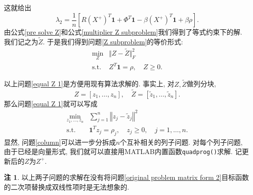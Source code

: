 \documentclass[UTF8,10.5pt,a4paper]{ctexart}
\theoremstyle{definition}
\theoremstyle{definition}
\newtheorem{rem}{注\hspace{0.05pt}}
\newcommand{\st}{\mathrm{s.t.}}
\newcommand{\one}{\mathbf{1}}
\begin{document}
这就给出
\begin{equation}
	\lambda_2=\frac{1}{n}\left[R\left(X^+\right)^T\one+\Phi^T\one-\beta\left(X^+\right)^T\one+\beta\rho\right].
	\label{multiplier Z subproblem}
\end{equation}
由公式\eqref{pre solve Z}和公式\eqref{multiplier Z subproblem}我们得到了等式约束下的解. 我们记之为$\widetilde Z$. 于是我们得到问题\eqref{Z subproblem}的等价形式:
\begin{equation}
	\begin{array}{rl}
		\min\limits_Z & \Vert Z-\widetilde Z\Vert_F^2\\
		\st & Z^T\one=\rho,\quad Z\ge0.
	\end{array}
	\label{equal Z 1}
\end{equation}
\par 以上问题\eqref{equal Z 1}是方便用现有算法求解的. 事实上, 对$Z,\widetilde Z$做列分块, 
$$Z=[z_1,\ldots,z_n],\quad\widetilde Z=[\tilde z_1,\ldots,\tilde z_n].$$
那么问题\eqref{equal Z 1}就可以写成
\begin{equation}
	\begin{array}{rl}
	\min\limits_{z_1,\ldots,z_n} & \sum\limits_{j=1}^n\left\Vert z_j-\tilde z_j\right\Vert^2\\
	\st & \one^Tz_j=\rho_j,\quad z_j\ge0,\quad j=1,\ldots,n.
	\end{array}
	\label{column}
\end{equation}
显然, 问题\eqref{column}可以进一步分拆成$n$个互补相关的列子问题. 对每个列子问题, 由于已经是向量形式, 我们就可以直接用MATLAB内置函数\texttt{quadprog()}求解. 记更新后的$Z$为$Z^+$.

\begin{rem}
	以上两子问题的求解在没有将问题\eqref{original problem matrix form 2}目标函数的二次项替换成双线性项时是无法想象的.
\end{rem}
\end{document}
